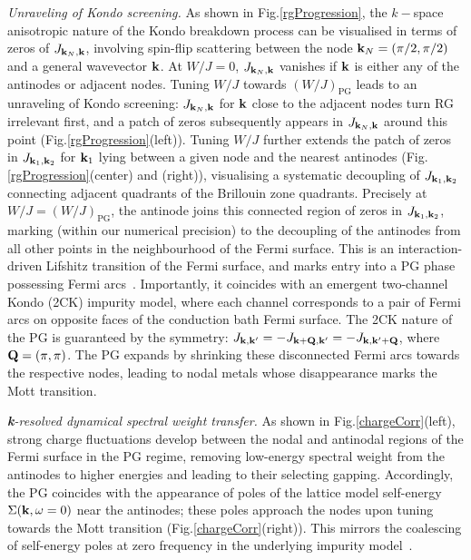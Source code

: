 \documentclass[%
 reprint,
superscriptaddress,
groupedaddress,
 amsmath,amssymb,
 aps,
prl,superscriptaddress
]{revtex4-2}
\begin{document}
\par\noindent\textit{Unraveling of Kondo screening.} 
As shown in Fig.\ref{rgProgression}, the $k-$space anisotropic nature of the Kondo breakdown process 
can be visualised in terms of zeros of $J_{{\bf k}_N, {\bf k}}$, involving spin-flip scattering between the node ${\bf k}_N = (\pi/2, \pi/2)$  and a general wavevector ${\bf k}$. 
At $W/J=0$, $J_{{\bf k}_N, {\bf k}}$ vanishes if ${\bf k}$ is either any of the antinodes or adjacent nodes. Tuning $W/J$ towards $(W/J)_{\text{PG}}$ leads to an unraveling of Kondo screening: $J_{{\bf k}_N, {\bf k}}$ for ${\bf k}$ close to the adjacent nodes turn RG irrelevant first, and a patch of zeros subsequently appears in $J_{{\bf k}_N, {\bf k}}$ around this point (Fig.\ref{rgProgression}(left)). Tuning $W/J$ further extends the patch of zeros in $J_{{\bf k}_1, {\bf k}_2}$ for ${\bf k}_{1}$ lying between a given node and the nearest antinodes (Fig.\ref{rgProgression}(center) and (right)), visualising a systematic decoupling of $J_{{\bf k}_1, {\bf k}_2}$ connecting adjacent quadrants of the Brillouin zone quadrants. Precisely at $W/J=(W/J)_{\text{PG}}$, the antinode joins this connected region of zeros in $J_{{\bf k}_1, {\bf k}_2}$, marking (within our numerical precision) to the decoupling of the antinodes from all other points in the neighbourhood of the Fermi surface. This is an interaction-driven Lifshitz transition of the Fermi surface, and marks entry into a PG phase possessing Fermi arcs~\cite{WuFerrero2018}. Importantly, it coincides with an emergent two-channel Kondo (2CK) impurity model, where each channel corresponds to a pair of Fermi arcs on opposite faces of the conduction bath Fermi surface. The 2CK nature of the PG is guaranteed by the symmetry: 
$J_{{\bf k},{\bf k'}}= -J_{{\bf k}+{\bf Q},{\bf k'}}=-J_{{\bf k},{\bf k'}+{\bf Q}}$, where ${\bf Q} = (\pi,\pi)$. The PG expands by shrinking these disconnected Fermi arcs towards the respective nodes, leading to nodal metals whose disappearance marks the Mott transition. 
\par\noindent\textit{{\bf k}-resolved dynamical spectral weight transfer.}
As shown in Fig.\ref{chargeCorr}(left), strong charge fluctuations develop between the nodal and antinodal regions of the Fermi surface in the PG regime, removing low-energy spectral weight from the antinodes to higher energies and leading to their selecting gapping. Accordingly, the PG coincides with the appearance of poles of the lattice model self-energy $\Sigma ({\bf k},\omega=0)$ near the antinodes; these poles approach the nodes upon tuning towards the Mott transition (Fig.\ref{chargeCorr}(right)). This mirrors the coalescing of self-energy poles at zero frequency in the underlying impurity model~\cite{suppmat}. 
\end{document}
